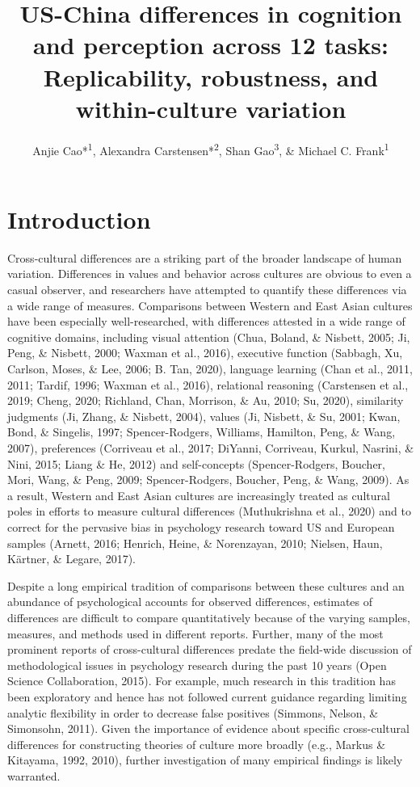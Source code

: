 \documentclass[
  man,floatsintext]{apa6}
\title{US-China differences in cognition and perception across 12 tasks: Replicability, robustness, and within-culture variation}
\author{Anjie Cao*\textsuperscript{1}, Alexandra Carstensen*\textsuperscript{2}, Shan Gao\textsuperscript{3}, \& Michael C. Frank\textsuperscript{1}}
\date{}
\affiliation{\vspace{0.5cm}\textsuperscript{1} Department of Psychology, Stanford University\\\textsuperscript{2} Department of Psychology, University of California, San Diego\\\textsuperscript{3} Department of Psychology, University of Chicago}
\begin{document}
\maketitle

\hypertarget{introduction}{%
\section{Introduction}\label{introduction}}

Cross-cultural differences are a striking part of the broader landscape of human variation. Differences in values and behavior across cultures are obvious to even a casual observer, and researchers have attempted to quantify these differences via a wide range of measures. Comparisons between Western and East Asian cultures have been especially well-researched, with differences attested in a wide range of cognitive domains, including visual attention (Chua, Boland, \& Nisbett, 2005; Ji, Peng, \& Nisbett, 2000; Waxman et al., 2016), executive function (Sabbagh, Xu, Carlson, Moses, \& Lee, 2006; B. Tan, 2020), language learning (Chan et al., 2011, 2011; Tardif, 1996; Waxman et al., 2016), relational reasoning (Carstensen et al., 2019; Cheng, 2020; Richland, Chan, Morrison, \& Au, 2010; Su, 2020), similarity judgments (Ji, Zhang, \& Nisbett, 2004), values (Ji, Nisbett, \& Su, 2001; Kwan, Bond, \& Singelis, 1997; Spencer-Rodgers, Williams, Hamilton, Peng, \& Wang, 2007), preferences (Corriveau et al., 2017; DiYanni, Corriveau, Kurkul, Nasrini, \& Nini, 2015; Liang \& He, 2012) and self-concepts (Spencer-Rodgers, Boucher, Mori, Wang, \& Peng, 2009; Spencer-Rodgers, Boucher, Peng, \& Wang, 2009). As a result, Western and East Asian cultures are increasingly treated as cultural poles in efforts to measure cultural differences (Muthukrishna et al., 2020) and to correct for the pervasive bias in psychology research toward US and European samples (Arnett, 2016; Henrich, Heine, \& Norenzayan, 2010; Nielsen, Haun, Kärtner, \& Legare, 2017).

Despite a long empirical tradition of comparisons between these cultures and an abundance of psychological accounts for observed differences, estimates of differences are difficult to compare quantitatively because of the varying samples, measures, and methods used in different reports. Further, many of the most prominent reports of cross-cultural differences predate the field-wide discussion of methodological issues in psychology research during the past 10 years (Open Science Collaboration, 2015). For example, much research in this tradition has been exploratory and hence has not followed current guidance regarding limiting analytic flexibility in order to decrease false positives (Simmons, Nelson, \& Simonsohn, 2011). Given the importance of evidence about specific cross-cultural differences for constructing theories of culture more broadly (e.g., Markus \& Kitayama, 1992, 2010), further investigation of many empirical findings is likely warranted.
\end{document}
